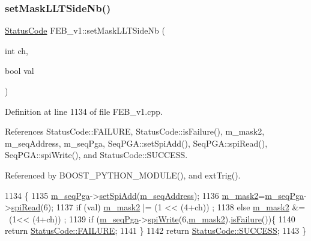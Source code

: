 \subsubsection{\texorpdfstring{set\+Mask\+L\+L\+T\+Side\+Nb()}{setMaskLLTSideNb()}}
{\footnotesize\ttfamily \hyperlink{classStatusCode}{Status\+Code} F\+E\+B\+\_\+v1\+::set\+Mask\+L\+L\+T\+Side\+Nb (\begin{DoxyParamCaption}\item[{int}]{ch,  }\item[{bool}]{val }\end{DoxyParamCaption})}



Definition at line 1134 of file F\+E\+B\+\_\+v1.\+cpp.



References Status\+Code\+::\+F\+A\+I\+L\+U\+RE, Status\+Code\+::is\+Failure(), m\+\_\+mask2, m\+\_\+seq\+Address, m\+\_\+seq\+Pga, Seq\+P\+G\+A\+::set\+Spi\+Add(), Seq\+P\+G\+A\+::spi\+Read(), Seq\+P\+G\+A\+::spi\+Write(), and Status\+Code\+::\+S\+U\+C\+C\+E\+SS.



Referenced by B\+O\+O\+S\+T\+\_\+\+P\+Y\+T\+H\+O\+N\+\_\+\+M\+O\+D\+U\+L\+E(), and ext\+Trig().


\begin{DoxyCode}
1134                                                    \{
1135   \hyperlink{classFEB__v1_a6c7804ac86796f233a8393043adf2e77}{m\_seqPga}->\hyperlink{classSeqPGA_ac998ce3a6d9b5f2e88cc8393f8c1df53}{setSpiAdd}(\hyperlink{classFEB__v1_a1c1eb093fd1733b9510fcf8bc5c7ad08}{m\_seqAddress});
1136   \hyperlink{classFEB__v1_a25f03f6de00618dd575fc1f77a9af9ee}{m\_mask2}=\hyperlink{classFEB__v1_a6c7804ac86796f233a8393043adf2e77}{m\_seqPga}->\hyperlink{classSeqPGA_ab3d0e5e5d4014bc7a92588a76b8713d4}{spiRead}(6);
1137   \textcolor{keywordflow}{if} (val)  \hyperlink{classFEB__v1_a25f03f6de00618dd575fc1f77a9af9ee}{m\_mask2} |= (1 << (4+ch))  ;
1138   \textcolor{keywordflow}{else}      \hyperlink{classFEB__v1_a25f03f6de00618dd575fc1f77a9af9ee}{m\_mask2} &= ~(1<< (4+ch)) ;
1139   \textcolor{keywordflow}{if} (\hyperlink{classFEB__v1_a6c7804ac86796f233a8393043adf2e77}{m\_seqPga}->\hyperlink{classSeqPGA_ad4421841ce4ce8b88ad13f63216f0743}{spiWrite}(6,\hyperlink{classFEB__v1_a25f03f6de00618dd575fc1f77a9af9ee}{m\_mask2}).\hyperlink{classStatusCode_a5dd22dc6eb2c52fc4cabc58f6dea2eb7}{isFailure}())\{
1140     \textcolor{keywordflow}{return} \hyperlink{classStatusCode_a6f565cbeadc76d14c72f047e5e85eb4ba3da73d4c469762eb9d3c960368252b26}{StatusCode::FAILURE};
1141   \}
1142   \textcolor{keywordflow}{return} \hyperlink{classStatusCode_a6f565cbeadc76d14c72f047e5e85eb4badd0da38d3ba0d922efd1f4619bc37ad8}{StatusCode::SUCCESS};
1143 \}
\end{DoxyCode}
\mbox{\label{classFEB__v1_a904bff89e5ad45ce78730502dc26a0e3}} 
